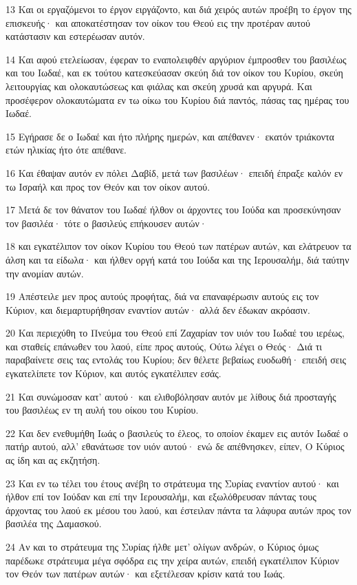 \par 13 Και οι εργαζόμενοι το έργον ειργάζοντο, και διά χειρός αυτών προέβη το έργον της επισκευής· και αποκατέστησαν τον οίκον του Θεού εις την προτέραν αυτού κατάστασιν και εστερέωσαν αυτόν.
\par 14 Και αφού ετελείωσαν, έφεραν το εναπολειφθέν αργύριον έμπροσθεν του βασιλέως και του Ιωδαέ, και εκ τούτου κατεσκεύασαν σκεύη διά τον οίκον του Κυρίου, σκεύη λειτουργίας και ολοκαυτώσεως και φιάλας και σκεύη χρυσά και αργυρά. Και προσέφερον ολοκαυτώματα εν τω οίκω του Κυρίου διά παντός, πάσας τας ημέρας του Ιωδαέ.
\par 15 Εγήρασε δε ο Ιωδαέ και ήτο πλήρης ημερών, και απέθανεν· εκατόν τριάκοντα ετών ηλικίας ήτο ότε απέθανε.
\par 16 Και έθαψαν αυτόν εν πόλει Δαβίδ, μετά των βασιλέων· επειδή έπραξε καλόν εν τω Ισραήλ και προς τον Θεόν και τον οίκον αυτού.
\par 17 Μετά δε τον θάνατον του Ιωδαέ ήλθον οι άρχοντες του Ιούδα και προσεκύνησαν τον βασιλέα· τότε ο βασιλεύς επήκουσεν αυτών·
\par 18 και εγκατέλιπον τον οίκον Κυρίου του Θεού των πατέρων αυτών, και ελάτρευον τα άλση και τα είδωλα· και ήλθεν οργή κατά του Ιούδα και της Ιερουσαλήμ, διά ταύτην την ανομίαν αυτών.
\par 19 Απέστειλε μεν προς αυτούς προφήτας, διά να επαναφέρωσιν αυτούς εις τον Κύριον, και διεμαρτυρήθησαν εναντίον αυτών· αλλά δεν έδωκαν ακρόασιν.
\par 20 Και περιεχύθη το Πνεύμα του Θεού επί Ζαχαρίαν τον υιόν του Ιωδαέ του ιερέως, και σταθείς επάνωθεν του λαού, είπε προς αυτούς, Ούτω λέγει ο Θεός· Διά τι παραβαίνετε σεις τας εντολάς του Κυρίου; δεν θέλετε βεβαίως ευοδωθή· επειδή σεις εγκατελίπετε τον Κύριον, και αυτός εγκατέλιπεν εσάς.
\par 21 Και συνώμοσαν κατ' αυτού· και ελιθοβόλησαν αυτόν με λίθους διά προσταγής του βασιλέως εν τη αυλή του οίκου του Κυρίου.
\par 22 Και δεν ενεθυμήθη Ιωάς ο βασιλεύς το έλεος, το οποίον έκαμεν εις αυτόν Ιωδαέ ο πατήρ αυτού, αλλ' εθανάτωσε τον υιόν αυτού· ενώ δε απέθνησκεν, είπεν, Ο Κύριος ας ίδη και ας εκζητήση.
\par 23 Και εν τω τέλει του έτους ανέβη το στράτευμα της Συρίας εναντίον αυτού· και ήλθον επί τον Ιούδαν και επί την Ιερουσαλήμ, και εξωλόθρευσαν πάντας τους άρχοντας του λαού εκ μέσου του λαού, και έστειλαν πάντα τα λάφυρα αυτών προς τον βασιλέα της Δαμασκού.
\par 24 Αν και το στράτευμα της Συρίας ήλθε μετ' ολίγων ανδρών, ο Κύριος όμως παρέδωκε στράτευμα μέγα σφόδρα εις την χείρα αυτών, επειδή εγκατέλιπον Κύριον τον Θεόν των πατέρων αυτών· και εξετέλεσαν κρίσιν κατά του Ιωάς.

